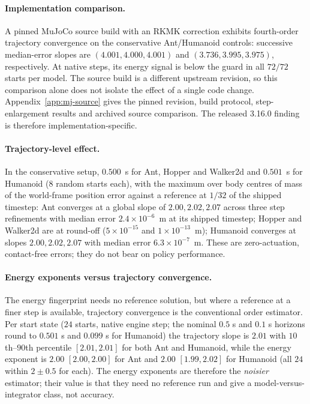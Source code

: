 \documentclass[10pt]{article}
\theoremstyle{definition}
\begin{document}
\paragraph{Implementation comparison.}
A pinned MuJoCo source build with an RKMK correction exhibits fourth-order
trajectory convergence on the conservative Ant/Humanoid controls: successive
median-error slopes are $(4.001,4.000,4.001)$ and $(3.736,3.995,3.975)$,
respectively. At native steps, its energy signal is below the guard in all
$72/72$ starts per model. The source build is a different upstream revision,
so this comparison alone does not isolate the effect of a single code change.
Appendix~\ref{app:mj-source} gives the pinned revision, build protocol,
step-enlargement results and archived source comparison. The released 3.16.0
finding is therefore implementation-specific.

\paragraph{Trajectory-level effect.} In the conservative setup,
$0.500$~s for Ant, Hopper and Walker2d and $0.501$~s for Humanoid
($8$ random starts each), with the maximum over body centres of mass of the world-frame
position error against a reference at $1/32$ of the shipped timestep: Ant converges at a global slope of
$2.00,2.02,2.07$ across three step refinements with median error $2.4\times10^{-6}$~m at its shipped timestep;
Hopper and Walker2d are at round-off ($5\times10^{-15}$ and $1\times10^{-13}$~m); Humanoid converges at slopes
$2.00,2.02,2.07$ with median error $6.3\times10^{-7}$~m. These are zero-actuation, contact-free errors; they do not bear on policy performance.

\paragraph{Energy exponents versus trajectory convergence.} The energy fingerprint needs no reference solution, but where a
reference at a finer step is available, trajectory convergence is the conventional order estimator. Per start state
($24$ starts, native engine step; the nominal $0.5$ s and $0.1$ s
horizons round to $0.501$ s and $0.099$ s for Humanoid) the trajectory slope is
$2.01$ with $10$th--$90$th percentile $[2.01,2.01]$ for both Ant and Humanoid,
while the energy exponent is $2.00$ $[2.00,2.00]$ for Ant and
$2.00$ $[1.99,2.02]$ for Humanoid (all $24$ within $2\pm0.5$ for each). The energy exponents are therefore
the \emph{noisier} estimator; their value is that they need no reference run and give a model-versus-integrator class, not accuracy.
\end{document}
